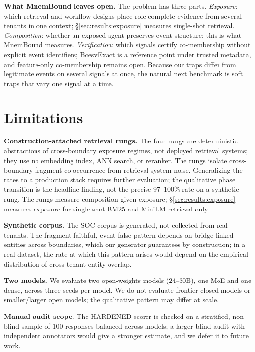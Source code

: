 \documentclass[conference,compsoc]{IEEEtran}
\begin{document}
\textbf{What MnemBound leaves open.}
The problem has three parts. \emph{Exposure}: which retrieval and workflow designs place role-complete evidence from several tenants in one context; \S\ref{sec:results:exposure} measures single-shot retrieval. \emph{Composition}: whether an exposed agent preserves event structure; this is what MnemBound measures. \emph{Verification}: which signals certify co-membership without explicit event identifiers; BcesvExact is a reference point under trusted metadata, and feature-only co-membership remains open. Because our traps differ from legitimate events on several signals at once, the natural next benchmark is soft traps that vary one signal at a time.



\section{Limitations}\label{sec:limitations}

\textbf{Construction-attached retrieval rungs.} The four rungs are deterministic abstractions of cross-boundary exposure regimes, not deployed retrieval systems; they use no embedding index, ANN search, or reranker. The rungs isolate cross-boundary fragment co-occurrence from retrieval-system noise. Generalizing the rates to a production stack requires further evaluation; the qualitative phase transition is the headline finding, not the precise 97--100\% rate on a synthetic rung. The rungs measure composition given exposure; \S\ref{sec:results:exposure} measures exposure for single-shot BM25 and MiniLM retrieval only.

\textbf{Synthetic corpus.} The SOC corpus is generated, not collected from real tenants. The fragment-faithful, event-false pattern depends on bridge-linked entities across boundaries, which our generator guarantees by construction; in a real dataset, the rate at which this pattern arises would depend on the empirical distribution of cross-tenant entity overlap.

\textbf{Two models.} We evaluate two open-weights models (24--30B), one MoE and one dense, across three seeds per model. We do not evaluate frontier closed models or smaller/larger open models; the qualitative pattern may differ at scale.

\textbf{Manual audit scope.} The HARDENED scorer is checked on a stratified, non-blind sample of 100 responses balanced across models; a larger blind audit with independent annotators would give a stronger estimate, and we defer it to future work.
\end{document}
